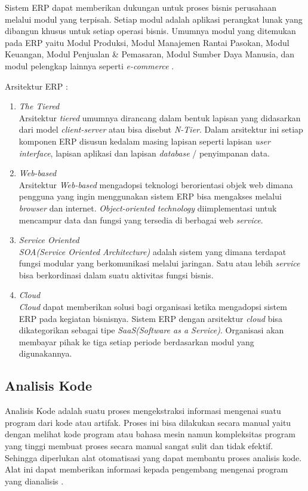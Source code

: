Sistem ERP dapat memberikan dukungan untuk proses bisnis perusahaan melalui modul yang terpisah. Setiap modul adalah aplikasi perangkat lunak yang dibangun khusus untuk setiap operasi bisnis. Umumnya modul yang ditemukan pada ERP yaitu Modul Produksi, Modul Manajemen Rantai Pasokan, Modul Keuangan, Modul Penjualan \& Pemasaran, Modul Sumber Daya Manusia, dan modul pelengkap lainnya seperti \textit{e-commerce} \cite{1}.

Arsitektur ERP \cite{1}: 
\begin{enumerate}[leftmargin=1.3cm]
	\item \textit{The Tiered}\\
	Arsitektur \textit{tiered} umumnya dirancang dalam bentuk lapisan yang didasarkan dari model \textit{client-server} atau bisa disebut \textit{N-Tier}. Dalam arsitektur ini setiap komponen ERP disusun kedalam masing lapisan seperti lapisan \textit{user interface}, lapisan aplikasi dan lapisan \textit{database} / penyimpanan data.
	\item \textit{Web-based}\\
	Arsitektur \textit{Web-based} mengadopsi teknologi berorientasi objek web dimana pengguna yang ingin menggunakan sistem ERP bisa mengakses melalui \textit{browser} dan internet. \textit{Object-oriented technology} diimplementasi untuk mencampur data dan fungsi yang tersedia di berbagai web \textit{service}.
	\item \textit{Service Oriented}\\
	\textit{SOA(Service Oriented Architecture)} adalah sistem yang dimana terdapat fungsi  modular yang berkomunikasi melalui jaringan. Satu atau lebih \textit{service} bisa berkordinasi dalam suatu aktivitas fungsi bisnis. 
	\item \textit{Cloud}\\
	\textit{Cloud} dapat memberikan solusi bagi organisasi ketika mengadopsi sistem ERP pada kegiatan bisnisnya. Sistem ERP dengan arsitektur \textit{cloud} bisa dikategorikan sebagai tipe \textit{SaaS(Software as a Service)}. Organisasi akan membayar pihak ke tiga setiap periode berdasarkan modul yang digunakannya.\\ 
\end{enumerate}

\subsection{Analisis Kode}
Analisis Kode adalah suatu proses mengekstraksi informasi mengenai suatu program dari kode atau artifak. Proses ini bisa dilakukan secara manual yaitu dengan melihat kode program atau bahasa mesin namun kompleksitas program yang tinggi membuat proses secara manual sangat sulit dan tidak efektif. Sehingga diperlukan alat otomatisasi yang dapat membantu proses analisis kode. Alat ini dapat memberikan informasi kepada pengembang mengenai program yang dianalisis \cite{9}. 

